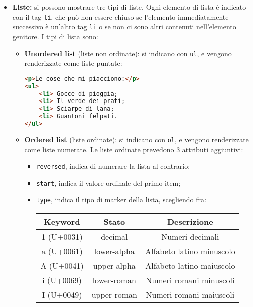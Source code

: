 \documentclass[a4paper,11pt]{article}
\begin{document}
\begin{itemize}
\item \textbf{Liste:} si possono mostrare tre tipi di liste.
	Ogni elemento di lista è indicato con il tag \lstinline|li|, che può non essere chiuso se l'elemento immediatamente successivo è un'altro tag \lstinline|li| o se non ci sono altri contenuti nell'elemento genitore.
	I tipi di lista sono:
	\begin{itemize}
		\item \textbf{Unordered list} (liste non ordinate): si indicano con \lstinline|ul|, e vengono renderizzate come liste puntate:
\begin{lstlisting}[language=html, style=codestyle]	
<p>Le cose che mi piacciono:</p>
<ul>
	<li> Gocce di pioggia;
	<li> Il verde dei prati;
	<li> Sciarpe di lana;
	<li> Guantoni felpati.
</ul>
\end{lstlisting}
		\item \textbf{Ordered list} (liste ordinate): si indicano con \lstinline|ol|, e vengono renderizzate come liste numerate. 
			Le liste ordinate prevedono 3 attributi aggiuntivi:
			\begin{itemize}
				\item \lstinline|reversed|, indica di numerare la lista al contrario;
				\item \lstinline|start|, indica il valore ordinale del primo item;
				\item \lstinline|type|, indica il tipo di marker della lista, scegliendo fra:
					\begin{table}[h!]
						\center {}
						\begin{tabular} { c | c | c }
							\bfseries Keyword & \bfseries Stato & \bfseries Descrizione \\
							\hline 
							1 (U+0031) & decimal & Numeri decimali \\ 
							a (U+0061) & lower-alpha & Alfabeto latino minuscolo \\ 
							A (U+0041) & upper-alpha & Alfabeto latino maiuscolo \\ 
							i (U+0069) & lower-roman & Numeri romani minuscoli \\
							I (U+0049) & upper-roman & Numeri romani maiuscoli
						\end{tabular}
					\end{table}
			\end{itemize}
			

\end{itemize}
\end{itemize}
\end{document}

